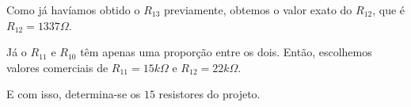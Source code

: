 Como já havíamos obtido o $R_{13}$ previamente, obtemos o valor exato do $R_{12}$, que é $R_{12} = 1337 \varOmega$.

Já o $R_{11}$ e $R_{10}$ têm apenas uma proporção entre os dois. Então, escolhemos valores comerciais de $R_{11} = 15k \Omega$ e $R_{12} = 22k \Omega$.

E com isso, determina-se os $15$ resistores do projeto.

